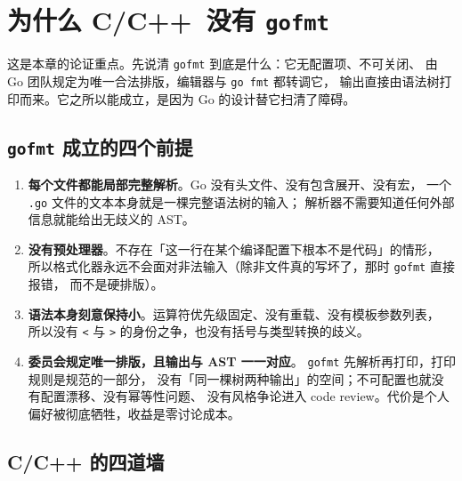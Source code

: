 \documentclass[12pt,a4paper,fontset=fandol]{ctexbook}
\newcommand{\Lang}[1]{\textsf{#1}}
\newcommand{\CL}{\Lang{C}}
\newcommand{\CPP}{\Lang{C++}}
\begin{document}
\section{为什么 \CL/\CPP\ 没有 \texttt{gofmt}}\label{sec:ch11-s4}

这是本章的论证重点。先说清 \texttt{gofmt} 到底是什么：它无配置项、不可关闭、
由 Go 团队规定为唯一合法排版，编辑器与 \texttt{go fmt} 都转调它，
输出直接由语法树打印而来。它之所以能成立，是因为 Go 的设计替它扫清了障碍。

\subsection{\texttt{gofmt} 成立的四个前提}\label{sec:ch11-s4-go}

\begin{enumerate}
  \item \textbf{每个文件都能局部完整解析}。Go 没有头文件、没有包含展开、没有宏，
    一个 \texttt{.go} 文件的文本本身就是一棵完整语法树的输入；
    解析器不需要知道任何外部信息就能给出无歧义的 AST。
  \item \textbf{没有预处理器}。不存在「这一行在某个编译配置下根本不是代码」的情形，
    所以格式化器永远不会面对非法输入（除非文件真的写坏了，那时 \texttt{gofmt} 直接报错，
    而不是硬排版）。
  \item \textbf{语法本身刻意保持小}。运算符优先级固定、没有重载、没有模板参数列表，
    所以没有 \texttt{<} 与 \texttt{>} 的身份之争，也没有括号与类型转换的歧义。
  \item \textbf{委员会规定唯一排版，且输出与 AST 一一对应}。
    \texttt{gofmt} 先解析再打印，打印规则是规范的一部分，
    没有「同一棵树两种输出」的空间；不可配置也就没有配置漂移、没有幂等性问题、
    没有风格争论进入 code review。代价是个人偏好被彻底牺牲，收益是零讨论成本。
\end{enumerate}

\subsection{C/C++ 的四道墙}\label{sec:ch11-s4-walls}
\end{document}
